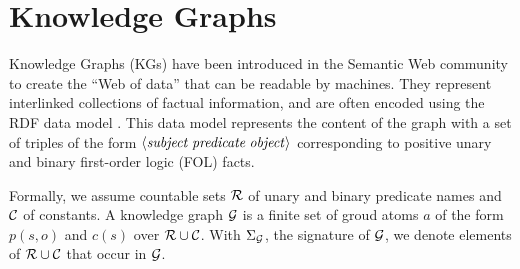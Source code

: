 \section{Knowledge Graphs}
\label{sec:kgs}

Knowledge Graphs (KGs) have been introduced in the Semantic Web community to create the ``Web of data'' that can be readable by machines. They represent interlinked collections of factual information, and  are often encoded using the RDF data model \cite{rdf2004}. This data model represents the content of the graph with a set of triples of the form $\langle\mathit{subject\;predicate\;object}\rangle$ corresponding to positive unary and binary first-order logic (FOL) facts.  %

Formally, we assume countable sets $\mathcal{R}$ of unary and binary predicate names and $\mathcal{C}$ of constants. A knowledge graph $\mathcal{G}$ is a finite set of groud atoms $a$ of the form $p(s,o)$ and $c(s)$ over $\mathcal{R} \cup \mathcal{C}$. With $\Sigma_{\mathcal{G}}$, the signature of $\mathcal{G}$, we denote elements of $\mathcal{R} \cup \mathcal{C}$ that occur in $\mathcal{G}$.

